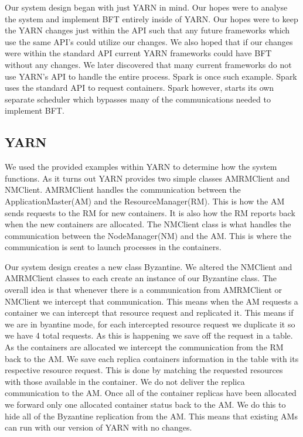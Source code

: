 \documentclass{sig-alternate}
\begin{document}
Our system design began with just YARN in mind. Our hopes were to analyse the system and implement BFT entirely inside of YARN. Our hopes were to 
keep the YARN changes just within the API such that any future frameworks which use the same API's could utilize our changes. We also hoped that if 
our changes were within the standard API current YARN frameworks could have BFT without any changes. We later discovered that many current frameworks 
do not use YARN's API to handle the entire process. Spark is once such example. Spark uses the standard API to request containers.
 Spark however, starts its own separate scheduler which bypasses many of the communications needed to implement BFT. 


\subsection{YARN}
We used the provided examples within YARN to determine how the system functions. As it turns out YARN provides two simple classes AMRMClient and 
NMClient. AMRMClient handles the communication between the ApplicationMaster(AM) and the ResourceManager(RM). This is how the AM sends requests to the RM
for new containers. It is also how the RM reports back when the new containers are allocated. The NMClient class is what handles the communication between
the NodeManager(NM) and the AM. This is where the communication is sent to launch processes in the containers. 

Our system design creates a new class Byzantine. We altered the NMClient and AMRMClient classes to each create an instance of our Byzantine class. The overall idea
is that whenever there is a communication from AMRMClient or NMClient we intercept that communication. This means when the AM requests a container we can intercept that
resource request and replicated it. This means if we are in byantine mode, for each intercepted resource request we duplicate it so we have 4 total requests. As this is happening
we save off the request in a table. As the containers are allocated we intercept the communication from the RM back to the AM. We save each replica containers information
in the table with its respective resource request. This is done by matching the requested resources with those available in the container. 
We do not deliver the replica communication to the AM. Once all of the 
container replicas have been allocated we forward only one allocated container status back to the AM. We do this to hide all of the Byzantine replication from the AM. This means 
that existing AMs can run with our version of YARN with no changes. 
\end{document}
